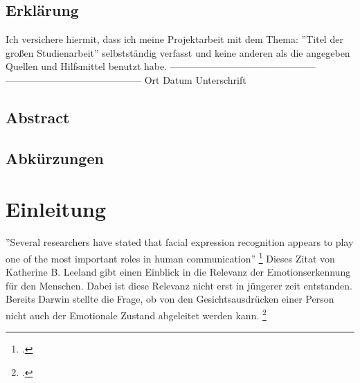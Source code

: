 \documentclass[12pt, a4paper]{scrbook}
\begin{document}

\setlength{\parindent}{0em} 
\renewcommand\thechapter{\Roman{chapter}}
\let\cleardoublepage\relax
\section*{Erklärung}
Ich versichere hiermit, dass ich meine Projektarbeit mit dem Thema: ''Titel der großen Studienarbeit'' selbstständig verfasst und keine anderen als die angegeben Quellen und Hilfsmittel benutzt habe. 
\newline
\newline
\newline
\newline
---------------------------------------------       ------------------------------------------ \newline
Ort	\hspace{2cm}		Datum\hspace{3,5 cm}				    Unterschrift
\newpage
\section*{Abstract}


\newpage
\begingroup
\renewcommand*{\chapterpagestyle}{empty}
\pagestyle{empty}
\tableofcontents
\listoffigures
\section*{Abkürzungen}
\begin{acronym}[Bash]
\end{acronym}
\endgroup
\newpage
\pagestyle{plain}
\setcounter{page}{1}
\chapter{Einleitung}
''Several researchers have stated that facial expression recognition appears to play one of the most important roles in human communication'' 
\footcite[Vgl.][1]{FaceRec}
Dieses Zitat von Katherine B. Leeland gibt einen Einblick in die Relevanz der Emotionserkennung für den Menschen. Dabei ist diese Relevanz nicht erst in jüngerer zeit entstanden. Bereits Darwin stellte die Frage, ob von den Gesichtsausdrücken einer Person nicht auch der Emotionale Zustand abgeleitet werden kann.
\footcite[Vgl.][2]{FaceRec}
\end{document}
